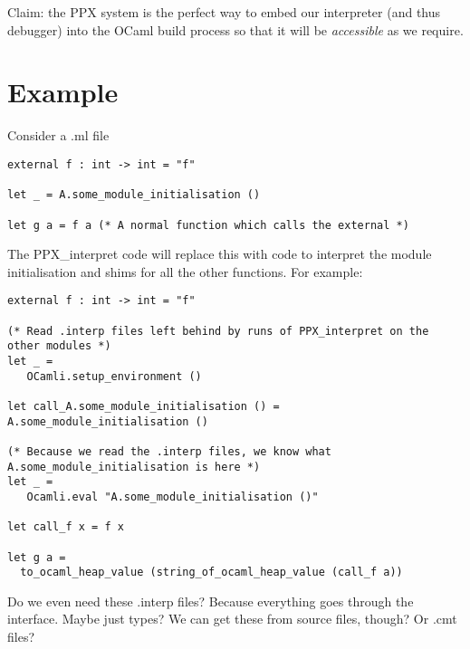 \documentclass[10pt]{article}
\begin{document}
\noindent Claim: the PPX system is the perfect way to embed our interpreter (and thus debugger) into the OCaml build process so that it will be \textit{accessible} as we require.

\section*{Example}

Consider a .ml file

\begin{verbatim}
external f : int -> int = "f"

let _ = A.some_module_initialisation ()

let g a = f a (* A normal function which calls the external *)
\end{verbatim}

\noindent The \textsf{PPX\_interpret} code will replace this with code to interpret the module initialisation and shims for all the other functions. For example:

\begin{verbatim}
external f : int -> int = "f"

(* Read .interp files left behind by runs of PPX_interpret on the other modules *)
let _ =
   OCamli.setup_environment ()

let call_A.some_module_initialisation () = A.some_module_initialisation ()

(* Because we read the .interp files, we know what A.some_module_initialisation is here *)
let _ =
   Ocamli.eval "A.some_module_initialisation ()"

let call_f x = f x

let g a =
  to_ocaml_heap_value (string_of_ocaml_heap_value (call_f a))

\end{verbatim}

\noindent Do we even need these .interp files? Because everything goes through the interface. Maybe just types? We can get these from source files, though? Or .cmt files?
\end{document}
